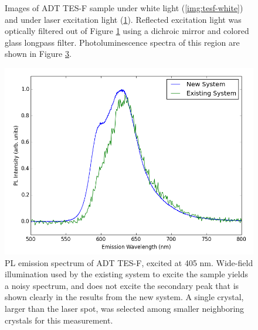 \begin{figure}[H]
\begin{subfigure}[b]{0.45\textwidth}
        \caption{}
        \label{img:tesf-laser}
    \end{subfigure}
    \caption[Images of ADT TES-F sample.]{Images of ADT TES-F sample under white light (\ref{img:tesf-white}) and under laser excitation light (\ref{img:tesf-laser}). Reflected excitation light was optically filtered out of Figure \ref{img:tesf-laser} using a dichroic mirror and colored glass longpass filter. Photoluminescence spectra of this region are shown in Figure \ref{fig:pl-adt-tesf}.}
    \label{img:tesf}
\end{figure}

\begin{figure}[H]
    \centering
    \includegraphics[width=.8\textwidth]{./img/tesf-2.png}%
    \caption[PL emission spectrum of ADT TES-F, excited at 405nm.]{PL emission spectrum of ADT TES-F, excited at 405 nm.
    Wide-field illumination used by the existing system to excite the sample
    yields a noisy spectrum, and does not excite the secondary peak that is 
    shown clearly in the results from the new system. A single crystal, larger than the laser spot, was selected among smaller neighboring crystals for this measurement. %
    }
    \label{fig:pl-adt-tesf}
\end{figure}

